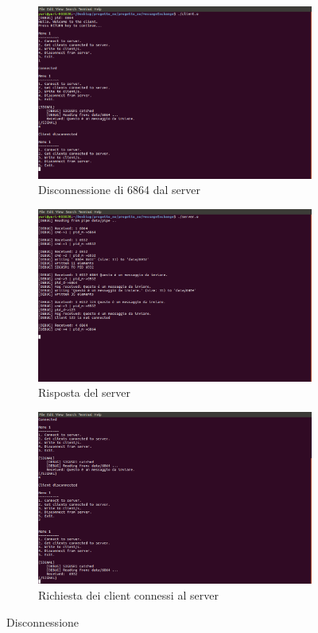 \begin{figure}
\centering
\begin{subfigure}[b]{0.7\textwidth}
\includegraphics[width=\textwidth]{screenmsg/13_client_6864}
\caption{Disconnessione di 6864 dal server}
\end{subfigure}
\begin{subfigure}[b]{0.7\textwidth}
\includegraphics[width=\textwidth]{screenmsg/14_server}
\caption{Risposta del server}
\end{subfigure}
\begin{subfigure}[b]{0.7\textwidth}
\includegraphics[width=\textwidth]{screenmsg/15_client_6864}
\caption{Richiesta dei client connessi al server}
\end{subfigure}
\caption{Disconnessione}
\end{figure}

